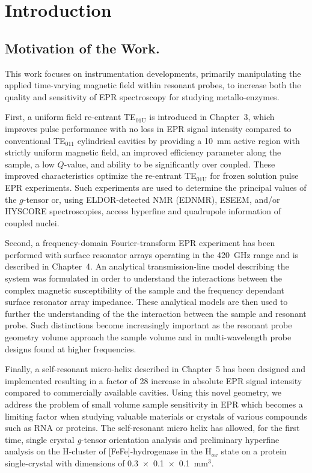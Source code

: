 \chapter[Introduction]{Introduction}





\section{Motivation of the Work.}
This work focuses on instrumentation developments, primarily manipulating the applied time-varying magnetic field within resonant probes, to increase both the quality and sensitivity of EPR spectroscopy for studying metallo-enzymes. 

First, a uniform field re-entrant TE$_{\text{01U}}$ is introduced in Chapter~3, which improves pulse performance with no loss in EPR signal intensity compared to conventional TE$_{011}$ cylindrical cavities by providing a 10~mm active region with strictly uniform magnetic field, an improved efficiency parameter along the sample, a low $Q$-value, and ability to be significantly over coupled. These improved characteristics optimize the re-entrant TE$_{\text{01U}}$ for frozen solution pulse EPR experiments. Such experiments are used to determine the principal values of the $g$-tensor or, using ELDOR-detected NMR (EDNMR), ESEEM, and/or HYSCORE spectroscopies, access hyperfine and quadrupole information of coupled nuclei. 

Second, a frequency-domain Fourier-transform EPR experiment has been performed with surface resonator arrays operating in the 420~GHz range and is described in Chapter~4. An analytical transmission-line model describing the system was formulated in order to understand the interactions between the complex magnetic susceptibility of the sample and the frequency dependant surface resonator array impedance. These analytical models are then used to further the understanding of the the interaction between the sample and resonant probe. Such distinctions become increasingly important as the resonant probe geometry volume approach the sample volume and in multi-wavelength probe designs found at higher frequencies. 

Finally, a self-resonant micro-helix  described in Chapter~5 has been designed and implemented resulting in a factor of 28 increase in absolute EPR signal intensity compared to commercially available cavities. Using this novel geometry, we address the problem of small volume sample sensitivity in EPR which becomes a limiting factor when studying valuable materials or crystals of various compounds such as RNA or proteins. The self-resonant micro helix has allowed, for the first time, single crystal \textit{g}-tensor orientation analysis and preliminary hyperfine analysis on the H-cluster of [FeFe]-hydrogenase in the H$_{ox}$ state on a protein single-crystal with dimensions of 0.3~$\times$~0.1~$\times$~0.1~mm$^3$. 

